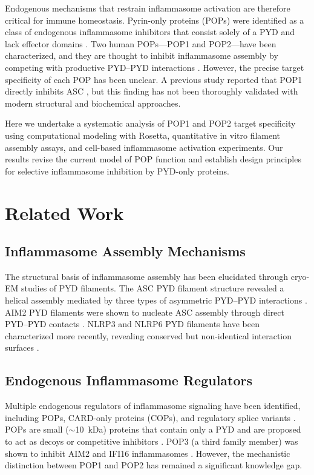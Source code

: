 \documentclass[11pt]{article}
\begin{document}
Endogenous mechanisms that restrain inflammasome activation are therefore critical for immune homeostasis. Pyrin-only proteins (POPs) were identified as a class of endogenous inflammasome inhibitors that consist solely of a PYD and lack effector domains \citep{stehlik2007,dorfleutner2007}. Two human POPs---POP1 and POP2---have been characterized, and they are thought to inhibit inflammasome assembly by competing with productive PYD--PYD interactions \citep{khare2014,ratsimandresy2017}. However, the precise target specificity of each POP has been unclear. A previous study reported that POP1 directly inhibits ASC \citep{stehlik2003}, but this finding has not been thoroughly validated with modern structural and biochemical approaches.

Here we undertake a systematic analysis of POP1 and POP2 target specificity using computational modeling with Rosetta, quantitative in vitro filament assembly assays, and cell-based inflammasome activation experiments. Our results revise the current model of POP function and establish design principles for selective inflammasome inhibition by PYD-only proteins.

\section{Related Work}

\subsection{Inflammasome Assembly Mechanisms}

The structural basis of inflammasome assembly has been elucidated through cryo-EM studies of PYD filaments. The ASC PYD filament structure revealed a helical assembly mediated by three types of asymmetric PYD--PYD interactions \citep{lu2014}. AIM2 PYD filaments were shown to nucleate ASC assembly through direct PYD--PYD contacts \citep{lu2015}. NLRP3 and NLRP6 PYD filaments have been characterized more recently, revealing conserved but non-identical interaction surfaces \citep{sborgi2015,sharif2019}.

\subsection{Endogenous Inflammasome Regulators}

Multiple endogenous regulators of inflammasome signaling have been identified, including POPs, CARD-only proteins (COPs), and regulatory splice variants \citep{stehlik2007,dorfleutner2007}. POPs are small ($\sim$10~kDa) proteins that contain only a PYD and are proposed to act as decoys or competitive inhibitors \citep{khare2014}. POP3 (a third family member) was shown to inhibit AIM2 and IFI16 inflammasomes \citep{khare2014}. However, the mechanistic distinction between POP1 and POP2 has remained a significant knowledge gap.
\end{document}
